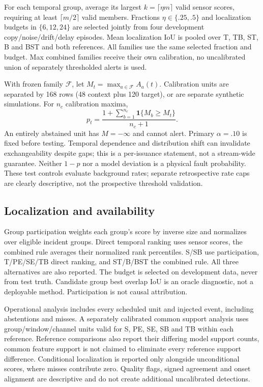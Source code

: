 \documentclass{llncs}
\begin{document}
For each temporal group, average its largest $k=\lceil\eta m\rceil$ valid sensor
scores, requiring at least $\lceil m/2\rceil$ valid members. Fractions
$\eta\in\{.25,.5\}$ and localization budgets in $\{6,12,24\}$ are selected
jointly from four development copy/noise/drift/delay episodes. Mean localization
IoU is pooled over T, TB, ST, B and BST and both references. All families use
the same selected fraction and budget. Max combined families receive their
own calibration, no uncalibrated union of separately thresholded alerts is used.

With frozen family $\mathcal F$, let $M_t=\max_{a\in\mathcal F}A_a(t)$.
Calibration units are separated by 168 rows (48 context plus 120 target), or
are separate synthetic simulations. For $n_c$ calibration maxima,
\begin{equation}
p_t=\frac{1+\sum_{b=1}^{n_c}\mathbf1\{M_b\geq M_t\}}{n_c+1}.
\label{eq:rank}
\end{equation}
An entirely abstained unit has $M=-\infty$ and cannot alert. Primary
$\alpha=.10$ is fixed before testing. Temporal dependence and distribution
shift can invalidate exchangeability despite gaps; this is a per-issuance
statement, not a stream-wide guarantee. Neither $1-p$ nor a model deviation
is a physical fault probability. These test controls evaluate background rates;
separate retrospective rate caps are clearly descriptive, not the prospective
threshold validation.









\subsection{Localization and availability}
Group participation weights each group's score by inverse size and normalizes
over eligible incident groups. Direct temporal ranking uses sensor scores,
the combined rule averages their normalized rank percentiles. S/SB use
participation, T/PE/SE/TB direct ranking, and ST/B/BST the combined rule.
All three alternatives are also reported. The budget is selected on development
data, never from test truth. Candidate group best overlap IoU is an oracle
diagnostic, not a deployable method. Participation is not causal attribution.

Operational analysis includes every scheduled unit and injected event, including
abstentions and misses. A separately calibrated common support analysis uses
group/window/channel units valid for S, PE, SE, SB and TB within each reference.
Reference comparisons also report their differing model support counts, common
feature support is not claimed to eliminate every reference support difference.
Conditional localization is reported only alongside unconditional scores, where
misses contribute zero. Quality flags, signed agreement and onset alignment
are descriptive and do not create additional uncalibrated detections.
\end{document}
